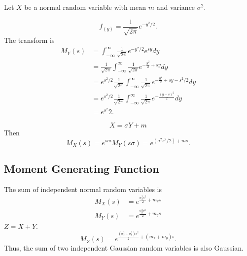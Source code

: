 \begin{example}
Let $X$ be a normal random variable with mean $m$ and variance $\sigma^2$.

\begin{equation*}
f_(y) = \frac{1}{\sqrt{2 \pi}} e^{- y^2 /2}.
\end{equation*}
The transform is
\begin{equation*}
\begin{split}
M_Y (s)
&= \int_{- \infty}^{\infty} \frac{1}{\sqrt{2 \pi}} e^{- y^2 / 2} e^{sy} dy \\
&= \frac{1}{\sqrt{2 \pi}}
\int_{- \infty}^{\infty} \frac{1}{\sqrt{2 \pi}} e^{- \frac{y^2}{2} + sy} dy \\
&= e^{s^2/2} \frac{1}{\sqrt{2 \pi}}
\int_{- \infty}^{\infty} \frac{1}{\sqrt{2 \pi}} e^{- \frac{y^2}{2} + sy - s^2/2} dy \\
&= e^{s^2/2} \frac{1}{\sqrt{2 \pi}}
\int_{- \infty}^{\infty} \frac{1}{\sqrt{2 \pi}} e^{- \frac{(y - s)^2}{2}} dy \\
&= e^{s^2}{2} .
\end{split}
\end{equation*}

\begin{equation*}
X = \sigma Y + m
\end{equation*}
Then
\begin{equation*}
M_X (s) = e^{sm} M_Y (s \sigma) = e^{(\sigma^2 s^2 / 2) + m s}.
\end{equation*}
\end{example}

\subsection{Moment Generating Function}





\begin{example}
The sum of independent normal random variables is
\begin{align*}
M_X (s) &= e^{\frac{\sigma_x^2 s^2}{2} + m_x s} \\
M_Y (s) &= e^{\frac{\sigma_y^2 s^2}{2} + m_y s}
\end{align*}
$Z = X + Y$.
\begin{equation*}
M_Z (s) = e^{\frac{(\sigma_x^2 + \sigma_y^2) s^2}{2} + (m_x + m_y) s} .
\end{equation*}
Thus, the sum of two independent Gaussian random variables is also Gaussian.
\end{example}


